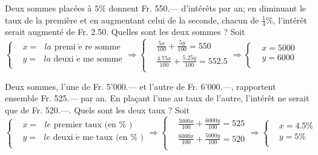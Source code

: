 \begin{solution}
Deux sommes placées à $5 \%$ donnent Fr. 550.— d’intérêts par an; en diminuant le taux de la première et en augmentant celui de la seconde, chacun de $\frac{1}{4} \%$, l’intérêt serait augmenté de Fr. 2.50. Quelles sont les deux sommes ?
Soit $\left\{ \begin{array}{ll}
  & x=\text{ }la\text{ premi }\!\!\grave{\mathrm{e}}\!\!\text{ re somme} \\ 
 & y=\text{ }la\text{ deuxi }\!\!\grave{\mathrm{e}}\!\!\text{ me somme} \\ 
\end{array} \right.\Rightarrow \left\{ \begin{array}{ll}
  & \frac{5x}{100}+\frac{5y}{100}=550 \\ 
 & \frac{4.75x}{100}+\frac{5.25y}{100}=552.5 \\ 
\end{array} \right.\Rightarrow \left\{ \begin{array}{ll}
  & x=5000 \\ 
 & y=6000 \\ 
\end{array} \right.$
\end{solution}

\begin{solution}
Deux sommes, l’une de Fr. 5’000.— et l’autre de Fr. 6’000.—, rapportent ensemble Fr. 525.— par an. En plaçant l’une au taux de l’autre, l’intérêt ne serait que de Fr. 520.—. Quels sont les deux taux ?
Soit $\left\{ \begin{array}{ll}
  & x=\text{ }le\text{ premier taux (en  }\!\!\%\!\!\text{ )} \\ 
 & y=\text{ }le\text{ deuxi }\!\!\grave{\mathrm{e}}\!\!\text{ me taux (en  }\!\!\%\!\!\text{ )} \\ 
\end{array} \right.\Rightarrow \left\{ \begin{array}{ll}
  & \frac{5000x}{100}+\frac{6000y}{100}=525 \\ 
 & \frac{6000x}{100}+\frac{5000y}{100}=520 \\ 
\end{array} \right.\Rightarrow \left\{ \begin{array}{ll}
  & x=4.5\% \\ 
 & y=5\% \\ 
\end{array} \right.$
\end{solution}

